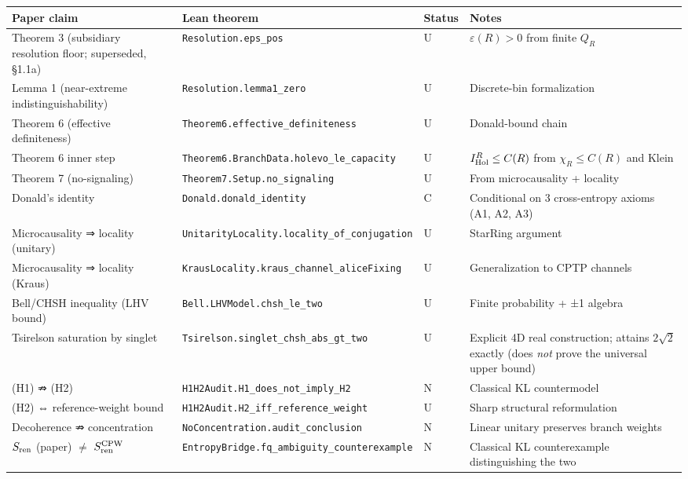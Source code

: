 \documentclass[11pt,a4paper]{article}
\begin{document}
\begin{center}
\small
\begin{tabularx}{\linewidth}{|Y|Y|Y|Y|}
\hline
\textbf{Paper claim} & \textbf{Lean theorem} & \textbf{Status} & \textbf{Notes} \\
\hline
Theorem 3 (subsidiary resolution floor; superseded, §1.1a) & \texttt{Resolution.eps\_pos} & U & $\varepsilon(R) > 0$ from finite $Q_R$ \\
\hline
Lemma 1 (near-extreme indistinguishability) & \texttt{Resolution.lemma1\_zero} & U & Discrete-bin formalization \\
\hline
Theorem 6 (effective definiteness) & \texttt{Theorem6.effective\_definiteness} & U & Donald-bound chain \\
\hline
Theorem 6 inner step & \texttt{Theorem6.BranchData.holevo\_le\_capacity} & U & $I_{\rm Hol}^R \le C(R)$ from $\chi_R \le C(R)$ and Klein \\
\hline
Theorem 7 (no-signaling) & \texttt{Theorem7.Setup.no\_signaling} & U & From microcausality + locality \\
\hline
Donald's identity & \texttt{Donald.donald\_identity} & C & Conditional on 3 cross-entropy axioms (A1, A2, A3) \\
\hline
Microcausality ⇒ locality (unitary) & \texttt{UnitarityLocality.locality\_of\_conjugation} & U & StarRing argument \\
\hline
Microcausality ⇒ locality (Kraus) & \texttt{KrausLocality.kraus\_channel\_aliceFixing} & U & Generalization to CPTP channels \\
\hline
Bell/CHSH inequality (LHV bound) & \texttt{Bell.LHVModel.chsh\_le\_two} & U & Finite probability + ±1 algebra \\
\hline
Tsirelson saturation by singlet & \texttt{Tsirelson.singlet\_chsh\_abs\_gt\_two} & U & Explicit 4D real construction; attains $2\sqrt{2}$ exactly (does \emph{not} prove the universal upper bound) \\
\hline
(H1) ⇏ (H2) & \texttt{H1H2Audit.H1\_does\_not\_imply\_H2} & N & Classical KL countermodel \\
\hline
(H2) ⇔ reference-weight bound & \texttt{H1H2Audit.H2\_iff\_reference\_weight} & U & Sharp structural reformulation \\
\hline
Decoherence ⇏ concentration & \texttt{NoConcentration.audit\_conclusion} & N & Linear unitary preserves branch weights \\
\hline
$S_{\rm ren}$ (paper) $\neq$ $S_{\rm ren}^{\rm CPW}$ & \texttt{EntropyBridge.fq\_ambiguity\_counterexample} & N & Classical KL counterexample distinguishing the two \\

\end{tabularx}
\end{center}
\end{document}
